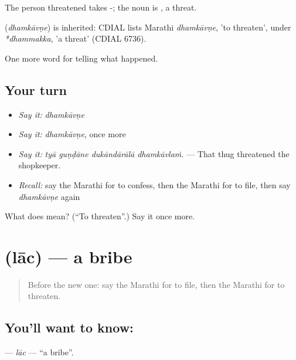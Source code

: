 The person threatened takes -; the noun is , a threat.

\begin{cousinweb}
\textbf{} (\emph{dhamkāvṇe}) is inherited: CDIAL lists Marathi \emph{dhamkāvṇe}, 'to threaten', under \emph{*dhammakka}, 'a threat' (CDIAL 6736).
\end{cousinweb}

\begin{grammarlens}[title={What you've built}]
One more word for telling what happened.
\end{grammarlens}

\subsection*{Your turn}
\begin{itemize}
\raggedright
  \item \emph{Say it:} \emph{dhamkāvṇe}
  \item \emph{Say it:} \emph{dhamkāvṇe}, once more
  \item \emph{Say it:} \emph{tyā guṇḍāne dukāndārālā dhamkāvlaṁ.} — That thug threatened the shopkeeper.
  \item \emph{Recall:} say the Marathi for to confess, then the Marathi for to file, then say \emph{dhamkāvṇe} again
\end{itemize}

\begin{tcolorbox}[breakable,colback=teal!4,colframe=teal!35!black,title={Before you move on}]
What does  mean? (\textquotedblleft{}To threaten\textquotedblright{}.) Say it once more.
\end{tcolorbox}
\section[\texorpdfstring{\mr{लाच} (lāc)}{लाच (lāc)}]{ (lāc) — a bribe}

\label{lesson:MR-C300-lac}



\begin{quote}
Before the new one: say the Marathi for to file, then the Marathi for to threaten.
\end{quote}

\subsection*{You'll want to know: }
\textbf{} — \emph{lāc} — \textquotedblleft{}a bribe\textquotedblright{}.

